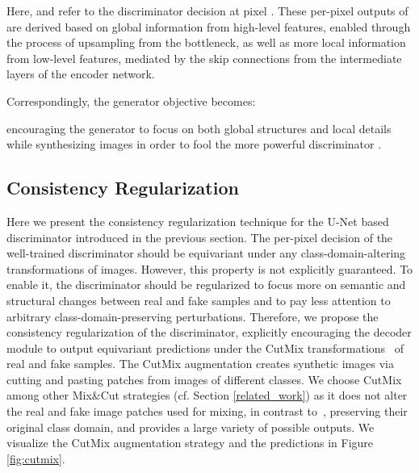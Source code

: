 \documentclass[10pt,twocolumn,letterpaper]{article}
\begin{document}
Here,  and  refer to the discriminator decision at pixel .  These per-pixel outputs of  are derived based on global information from high-level features, enabled through the process of upsampling from the bottleneck, as well as more local information from low-level features, mediated by the skip connections from the intermediate layers of the encoder network.

Correspondingly, the generator objective becomes:

encouraging the generator to focus on both global structures and local details while synthesizing images in order to fool the more powerful discriminator .











\subsection{Consistency Regularization} \label{subsec:method-cutmix}



Here we present the consistency regularization technique for the U-Net based discriminator introduced in the previous section. The per-pixel decision of the well-trained  discriminator should be equivariant under any class-domain-altering transformations of images. However, this property is not explicitly guaranteed.
To enable it, the discriminator should be regularized to focus more on semantic and structural changes between real and fake samples and to pay less attention to arbitrary class-domain-preserving perturbations.
Therefore, we propose
the consistency regularization of the 
discriminator, explicitly encouraging the decoder module  to output equivariant predictions under the
CutMix transformations~\cite{Yun2019CutMixRS} of real and fake samples.
The CutMix augmentation creates synthetic images via cutting and pasting patches from images of different classes.
We choose CutMix among other Mix\&Cut strategies (cf. Section \ref{related_work}) as it does not alter the real and fake image patches used for mixing, in contrast to~\cite{zhang2018mixup}, preserving their original class domain, and provides a large variety of possible outputs. We visualize the CutMix augmentation strategy and the  predictions in Figure \ref{fig:cutmix}.
\end{document}
